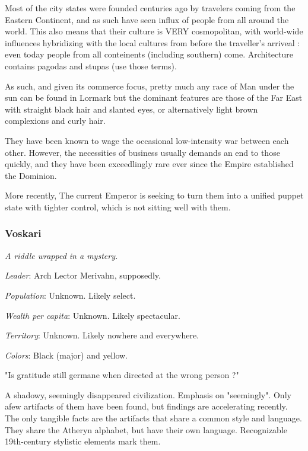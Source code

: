 Most of the city states were founded centuries ago by travelers coming from the Eastern Continent, and as such have seen influx of people from all around the world. This also means that their culture is VERY cosmopolitan, with world-wide influences hybridizing with the local cultures from before the traveller's arriveal : even today people from all conteinents (including southern) come. Architecture contains pagodas and stupas (use those terms).

As such, and given its commerce focus, pretty much any race of Man under the sun can be found in Lormark but the dominant features are those of the Far East with straight black hair and slanted eyes, or alternatively light brown complexions and curly hair.

They have been known to wage the occasional low-intensity war between each other. However, the necessities of business usually demands an end to those quickly, and they have been exceedlingly rare ever since the Empire established the Dominion.

More recently, The current Emperor is seeking to turn them into a unified puppet state with tighter control, which is not sitting well with them.

	

\subsubsection{Voskari}

\textit{A riddle wrapped in a mystery.}

\textit{Leader}: Arch Lector Merivahn, supposedly.

\textit{Population}: Unknown. Likely select.

\textit{Wealth per capita}: Unknown. Likely spectacular.

\textit{Territory}: Unknown. Likely nowhere and everywhere.
    
\textit{Colors}: Black (major) and yellow.


\begin{rpg-quotebox}
	"Is gratitude still germane when directed at the wrong person ?"
\end{rpg-quotebox}

A shadowy, seemingly disappeared civilization. Emphasis on "seemingly". Only afew artifacts of them have been found, but findings are accelerating recently. The only tangible facts are the artifacts that share a common style and language. They share the Atheryn alphabet, but have their own language. Recognizable 19th-century stylistic elements mark them.

